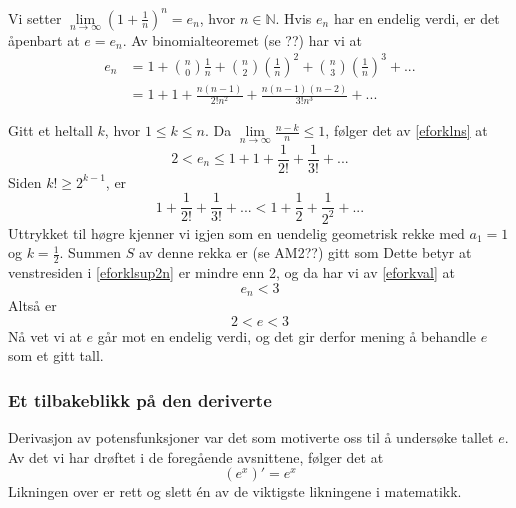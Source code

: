 Vi setter $ {\lim\limits_{n\to \infty}\left(1+\frac{1}{n}\right)^n=e_n} $, hvor $ {n\in\mathbb{N}} $. Hvis $ e_n $ har en endelig verdi, er det åpenbart at $ e=e_n $.
Av binomialteoremet (se ??) har vi at
\begin{align}
	e_n&=1+\binom{n}{0}\frac{1}{n}+\binom{n}{2}\left(\frac{1}{n}\right)^2+\binom{n}{3}\left(\frac{1}{n}\right)^3+...\nonumber\\
	&= 1+1+\frac{n(n-1)}{2!n^2}+\frac{n(n-1)(n-2)}{3!n^3}+... \label{eforklns}
\end{align}
\begin{comment}
Videre legger vi merke til at
\alg{
\frac{n(n-1)}{2!n^2}&= \frac{1}{2!}\left(\frac{n}{n}-\frac{1}{n}\right)\br&=\frac{1}{2!}\left(1-\frac{1}{n}\right) \\[15pt]
\frac{n(n-1)(n-2)}{3!n^3}&=\frac{1}{3!}\left(1-\frac{1}{n}\right)\left(1-\frac{2}{n}\right)
}
Altså er
\begin{equation}\label{eforklvalpre}
\left(1+\frac{1}{n}\right)^n=1+1+\frac{1}{2!}\left(1-\frac{1}{n}\right)+\frac{1}{3!}\left(1-\frac{1}{n}\right)\left(1-\frac{2}{n}\right)+...
\end{equation}
\end{comment}
Gitt et heltall $ k $, hvor $ 1\leq k\leq n $. Da $\lim\limits_{n\to\infty} \frac{n-k}{n}\leq 1 $, følger det av \eqref{eforklns} at
\begin{equation}\label{eforkval}
2<e_n\leq1+1+\frac{1}{2!}+\frac{1}{3!}+...
\end{equation}
Siden  $ k!\geq 2^{k-1} $, er
\begin{equation}\label{eforklsup2n}
	1+\frac{1}{2!}+\frac{1}{3!}+...<1+\frac{1}{2}+\frac{1}{2^2}+...
\end{equation}
Uttrykket til høgre kjenner vi igjen som en uendelig geometrisk rekke med $ a_1=1 $ og $ k=\frac{1}{2} $. Summen $ S $ av denne rekka er (se AM2??) gitt som
Dette betyr at venstresiden i \eqref{eforklsup2n} er mindre enn 2, og da har vi av \eqref{eforkval} at
\[ e_n<3 \]
Altså er
\[ 2<e<3\]
Nå vet vi at $ e $ går mot en endelig verdi, og det gir derfor mening å behandle $ e $ som et gitt tall.

\subsubsection{Et tilbakeblikk på den deriverte}
Derivasjon av potensfunksjoner var det som motiverte oss til å undersøke tallet $ e $. Av det vi har drøftet i de foregående avsnittene, følger det at
\[ \left(e^x\right)'=e^x \]
Likningen over er rett og slett én av de viktigste likningene i matematikk.
